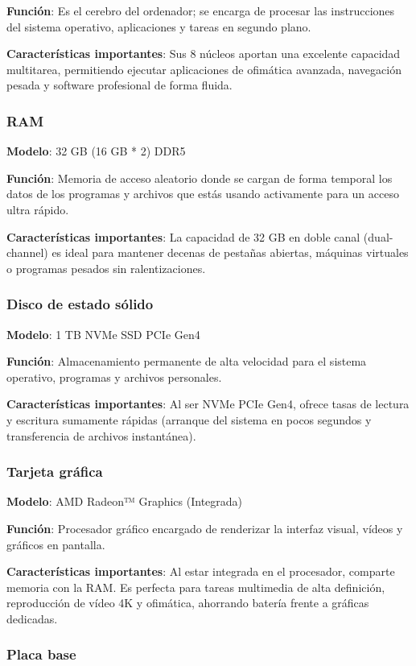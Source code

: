 \documentclass[11.5pt]{article}
\begin{document}
	\textbf{Función}: Es el cerebro del ordenador; se encarga de procesar las instrucciones del sistema operativo, aplicaciones y tareas en segundo plano.
	
	\textbf{Características importantes}: Sus 8 núcleos aportan una excelente capacidad multitarea, permitiendo ejecutar aplicaciones de ofimática avanzada, navegación pesada y software profesional de forma fluida.

	\subsubsection*{RAM}
	\textbf{Modelo}: 32 GB (16 GB * 2) DDR5
	
	\textbf{Función}: Memoria de acceso aleatorio donde se cargan de forma temporal los datos de los programas y archivos que estás usando activamente para un acceso ultra rápido.
	
	\textbf{Características importantes}: La capacidad de 32 GB en doble canal (dual-channel) es ideal para mantener decenas de pestañas abiertas, máquinas virtuales o programas pesados sin ralentizaciones.

	\subsubsection*{Disco de estado sólido}
	\textbf{Modelo}: 1 TB NVMe SSD PCIe Gen4
	
	\textbf{Función}: Almacenamiento permanente de alta velocidad para el sistema operativo, programas y archivos personales.
	
	\textbf{Características importantes}: Al ser NVMe PCIe Gen4, ofrece tasas de lectura y escritura sumamente rápidas (arranque del sistema en pocos segundos y transferencia de archivos instantánea).

	\subsubsection*{Tarjeta gráfica}
	\textbf{Modelo}: AMD Radeon™ Graphics (Integrada)
	
	\textbf{Función}: Procesador gráfico encargado de renderizar la interfaz visual, vídeos y gráficos en pantalla.
	
	\textbf{Características importantes}: Al estar integrada en el procesador, comparte memoria con la RAM. Es perfecta para tareas multimedia de alta definición, reproducción de vídeo 4K y ofimática, ahorrando batería frente a gráficas dedicadas.
	\subsubsection*{Placa base}
	
\end{document}
